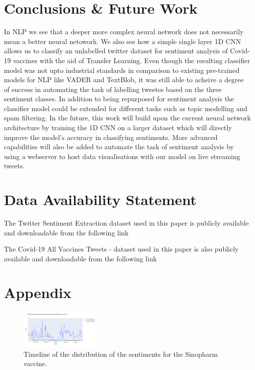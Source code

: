 \documentclass[conference]{IEEEtran}
\begin{document}
\section{Conclusions \& Future Work} \label{section:conclusion}
In NLP we see that a deeper more complex neural network does not necessarily mean a better neural netowork. We also see how a simple single layer 1D CNN allows us to classify an unlabelled twitter dataset for sentiment analysis of Covid-19 vaccines with the aid of Transfer Learning. Even though the resulting classifier model was not upto industrial standards in comparison to existing pre-trained models for NLP like VADER and TextBlob, it was still able to acheive a degree of success in automating the task of labelling tweetes based on the three sentiment classes. In addition to being repurposed for sentiment analysis the classifier model could be extended for different tasks such as topic modelling and spam filtering. In the future, this work will build upon the current neural network architecture by training the 1D CNN on a larger dataset which will directly improve the model's accuracy in classifying sentiments. More advanced capabilities will also be added to automate the task of sentiment analysis by using a webserver to host data visualisations with our model on live streaming tweets. \\


\section{Data Availability Statement}

The Twitter Sentiment Extraction dataset used in this paper is publicly available and downloadable from the following link ~\cite{bworld}

The Covid-19 All Vaccines Tweets - dataset used in this paper is also publicly available and downloadable from the following link ~\cite{cworld}





\newpage

\section{Appendix}

\begin{figure}[h]
\centering
\includegraphics[width=0.35\textwidth]{sinopharm.png}
\caption{Timeline of the distribution of the sentiments for the Sinopharm vaccine.}
\label{fig:fig23}
\end{figure} 
\end{document}

